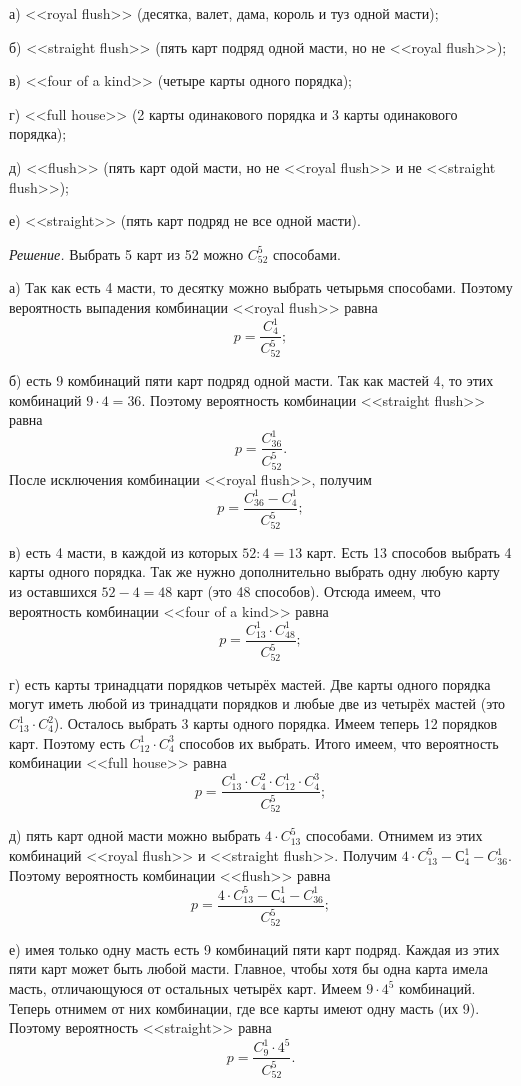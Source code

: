 \documentclass{book}
\begin{document}
а) <<royal flush>> (десятка, валет, дама, король и туз одной масти);

б) <<straight flush>> (пять карт подряд одной масти, но не <<royal flush>>);

в) <<four of a kind>> (четыре карты одного порядка);

г) <<full house>> (2 карты одинакового порядка и 3 карты одинакового порядка);

д) <<flush>> (пять карт одой масти, но не <<royal flush>> и не <<straight flush>>);

е) <<straight>> (пять карт подряд не все одной масти).

\textit{Решение.} Выбрать 5 карт из 52 можно $ C_{52}^5 $ способами.

а) Так как есть 4 масти, то десятку можно выбрать четырьмя способами.
Поэтому вероятность выпадения комбинации <<royal flush>> равна
$$ p =
\frac{ C_4^1 }{ C_{52}^5 };$$

б) есть 9 комбинаций пяти карт подряд одной масти.
Так как мастей 4, то этих комбинаций $ 9 \cdot 4 = 36 $.
Поэтому вероятность комбинации <<straight flush>> равна
$$ p =
\frac{ C_{36}^1 }{ C_{52}^5 }.$$
После исключения комбинации <<royal flush>>, получим
$$ p =
\frac{ C_{36}^1 - C_4^1 }{ C_{52}^5 };$$

в) есть 4 масти, в каждой из которых $ 52 : 4 = 13 $ карт.
Есть 13 способов выбрать 4 карты одного порядка.
Так же нужно дополнительно выбрать одну любую карту из оставшихся $ 52 - 4 = 48 $ карт (это 48 способов).
Отсюда имеем, что вероятность комбинации <<four of a kind>> равна
$$ p =
\frac{ C_{13}^1 \cdot C_{48}^1 }{ C_{52}^5 };$$

г) есть карты тринадцати порядков четырёх мастей.
Две карты одного порядка могут иметь любой из тринадцати порядков и любые две из четырёх мастей (это $ C_{13}^1 \cdot C_4^2 $).
Осталось выбрать 3 карты одного порядка. Имеем теперь 12 порядков карт.
Поэтому есть $ C_{12}^1 \cdot C_4^3 $ способов их выбрать.
Итого имеем, что вероятность комбинации <<full house>> равна
$$ p =
\frac{ C_{13}^1 \cdot C_4^2 \cdot C_{12}^1 \cdot C_4^3 }{ C_{52}^5 };$$

д) пять карт одной масти можно выбрать $ 4 \cdot C_{13}^5 $ способами.
Отнимем из этих комбинаций <<royal flush>> и <<straight flush>>.
Получим $ 4 \cdot C_{13}^5 - С_4^1 - C_{36}^1 $.
Поэтому вероятность комбинации <<flush>> равна
$$ p =
\frac{ 4 \cdot C_{13}^5 - С_4^1 - C_{36}^1 }{ C_{52}^5 };$$

е) имея только одну масть есть 9 комбинаций пяти карт подряд.
Каждая из этих пяти карт может быть любой масти.
Главное, чтобы хотя бы одна карта имела масть, отличающуюся от остальных четырёх карт.
Имеем $ 9 \cdot 4^5 $ комбинаций.
Теперь отнимем от них комбинации, где все карты имеют одну масть (их 9).
Поэтому вероятность <<straight>> равна
$$ p =
\frac{ C_9^1 \cdot 4^5 }{ C_{52}^5 }.$$
\end{document}
